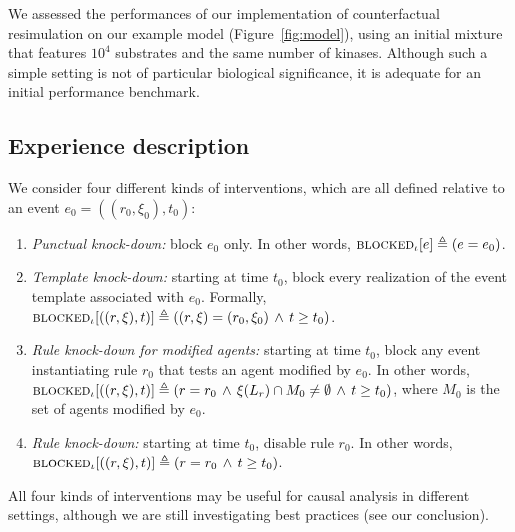 
\newcommand{\subs}[2]{#1_{\textsf{#2}}}

We assessed the performances of our implementation of counterfactual
resimulation on our example model (Figure~\ref{fig:model}), using an
initial mixture that features $10^4$ substrates and the same number of
kinases.  Although such a simple setting is not of particular
biological significance, it is adequate for an initial performance
benchmark.

\subsection{Experience description}

We consider four different kinds of
interventions, which are all defined relative to an event
$e_0=((r_0, \xi_0), t_0)$:
\begin{enumerate}[leftmargin=0.4cm]
\item \textit{Punctual knock-down:} block $e_0$ only. In other words,
  ${\textsc{blocked}}_{\iota}[e] \triangleq (e = e_0)$.
\item \textit{Template knock-down:} starting at time $t_0$, block
  every realization of the event template associated with $e_0$.
Formally,
  ${\textsc{blocked}}_{\iota}[((r, \xi), t)] \triangleq ((r, \xi) = (r_0, \xi_0)
  \,\wedge\, t \geq t_0)$.
\item \textit{Rule knock-down for modified agents:} starting at time
  $t_0$, block any event instantiating rule $r_0$ that tests an agent
  modified by $e_0$. In other words,
  ${\textsc{blocked}}_{\iota}[((r, \xi), t)] \triangleq (r = r_0 \,\wedge\, \xi(L_r)
  \cap M_0 \neq \emptyset \,\wedge\, t \geq t_0)$, where $M_0$ is the
  set of agents modified by $e_0$.
\item \textit{Rule knock-down:} starting at time $t_0$, disable rule
  $r_0$. In other words,
  ${\textsc{blocked}}_{\iota}[((r, \xi), t)] \triangleq (r = r_0 \,\wedge\, t \geq
  t_0)$.
\end{enumerate}
All four kinds of interventions may be useful for causal analysis in
different settings, although we are still investigating best practices
(see our conclusion).

